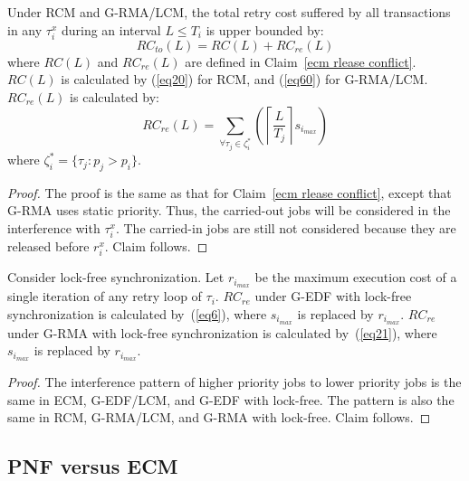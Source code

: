 \begin{clm}\label{rcm rlease conflict}
Under RCM and G-RMA/LCM, the total retry cost suffered by all transactions in any $\tau_i^x$ during an interval $L\le T_i$ is upper bounded by:
\begin{equation}
RC_{to}(L)=RC(L)+RC_{re}(L)
\label{total rc rcm eq}
\end{equation}
%
where $RC(L)$ and $RC_{re}(L)$ are defined in Claim~\ref{ecm rlease conflict}. $RC(L)$ is calculated by (\ref{eq20}) for RCM, and (\ref{eq60}) for G-RMA/LCM. $RC_{re}(L)$ is calculated by:
\begin{equation}
RC_{re}(L)=\sum_{\forall \tau_j \in \zeta_i^*}\left(\left\lceil\frac{L}{T_j}\right\rceil s_{i_{max}}\right)\label{eq21}
\end{equation}
%
where $\zeta_i^*=\{\tau_j:p_j > p_i \}$.
\end{clm}
\begin{proof}\normalfont
The proof is the same as that for Claim~\ref{ecm rlease conflict}, except that G-RMA uses static priority. Thus, the carried-out jobs will be considered in the  interference with $\tau_i^x$. The carried-in jobs are still not considered because they are released before $r_i^x$. Claim follows.
\end{proof}
\begin{clm}\label{lock free release}
Consider lock-free synchronization. Let $r_{i_{max}}$ be the maximum execution cost of a single iteration of any retry loop of $\tau_i$. $RC_{re}$ under G-EDF  with lock-free synchronization is calculated by~(\ref{eq6}), where $s_{i_{max}}$ is replaced by $r_{i_{max}}$. $RC_{re}$ under G-RMA with lock-free synchronization is calculated by~(\ref{eq21}), where $s_{i_{max}}$ is replaced by $r_{i_{max}}$.
\end{clm}
%
\begin{proof}\normalfont
The interference pattern of higher priority jobs to lower priority jobs is the same in ECM, G-EDF/LCM, and G-EDF with lock-free. The pattern is also the same in RCM, G-RMA/LCM, and G-RMA with lock-free. Claim follows.
\end{proof}


\subsection{PNF versus ECM\label{pnf vs ecm sec}}

